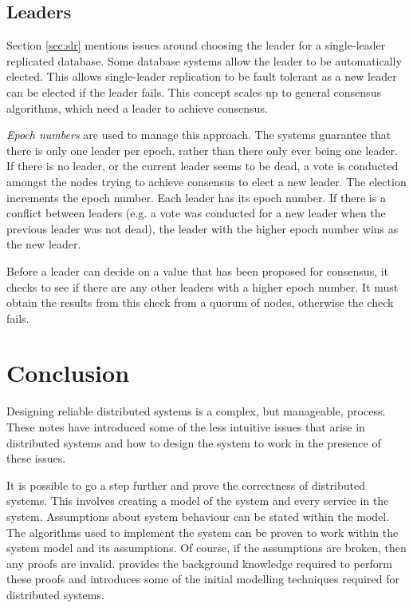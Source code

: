 \subsection{Leaders}

Section \ref{sec:slr} mentions issues around choosing the leader for a single-leader replicated database.
Some database systems allow the leader to be automatically elected.
This allows single-leader replication to be fault tolerant as a new leader can be elected if the leader fails.
This concept scales up to general consensus algorithms, which need a leader to achieve consensus.

\emph{Epoch numbers} are used to manage this approach.
The systems guarantee that there is only one leader per epoch, rather than there only ever being one leader.
If there is no leader, or the current leader seems to be dead,
a vote is conducted amongst the nodes trying to achieve consensus to elect a new leader.
The election increments the epoch number.
Each leader has its epoch number.
If there is a conflict between leaders (e.g. a vote was conducted for a new leader when the previous leader was not dead),
the leader with the higher epoch number wins as the new leader.

Before a leader can decide on a value that has been proposed for consensus,
it checks to see if there are any other leaders with a higher epoch number.
It must obtain the results from this check from a quorum of nodes,
otherwise the check fails.


\section{Conclusion}

Designing reliable distributed systems is a complex, but manageable, process.
These notes have introduced some of the less intuitive issues that arise in distributed systems
and how to design the system to work in the presence of these issues.

It is possible to go a step further and prove the correctness of distributed systems.
This involves creating a model of the system and every service in the system.
Assumptions about system behaviour can be stated within the model.
The algorithms used to implement the system can be proven to work within the system model and its assumptions.
Of course, if the assumptions are broken, then any proofs are invalid.
provides the background knowledge required to perform these proofs
and introduces some of the initial modelling techniques required for distributed systems.

